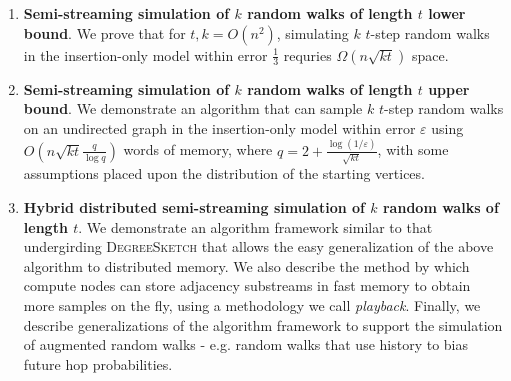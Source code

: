 \documentclass[10]{report}
\newcommand{\algoname}[1]{\textnormal{\textsc{#1}}}
\begin{document}
\begin{enumerate}
	\item \textbf{Semi-streaming simulation of $k$ random walks of length $t$ lower bound}.
	We prove that for $t, k = O(n^2)$, simulating $k$ $t$-step random walks in the insertion-only model within error $\frac{1}{3}$ requries $\Omega(n\sqrt{kt})$ space.
	\item \textbf{Semi-streaming simulation of $k$ random walks of length $t$ upper bound}.
	We demonstrate an algorithm that can sample $k$ $t$-step random walks on an undirected graph in the insertion-only model within error $\varepsilon$  using $O \left ( n\sqrt{kt}\frac{q}{\log q} \right )$ words of memory, where $q = 2 + \frac{\log(1/\varepsilon)}{\sqrt{kt}}$, with some assumptions placed upon the distribution of the starting vertices.
	\item \textbf{Hybrid distributed semi-streaming simulation of $k$ random walks of length $t$}.
	We demonstrate an algorithm framework similar to that undergirding \algoname{DegreeSketch} that allows the easy generalization of the above algorithm to distributed memory. 
	We also describe the method by which compute nodes can store adjacency substreams in fast memory to obtain more samples on the fly, using a methodology we call \emph{playback}.
	Finally, we describe generalizations of the algorithm framework to support the simulation of augmented random walks - e.g. random walks that use history to bias future hop probabilities.
\end{enumerate}
%
\end{document}
